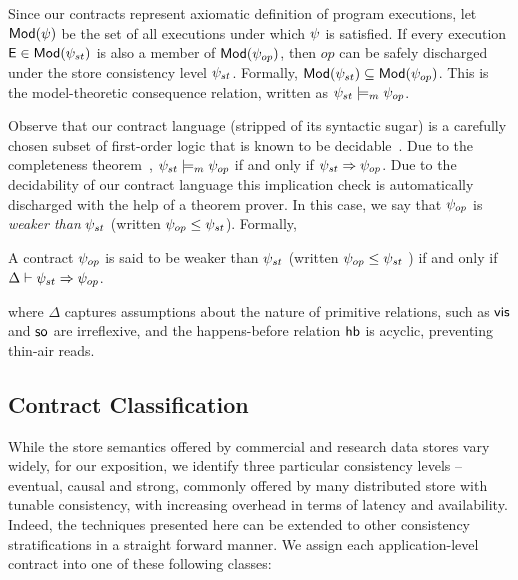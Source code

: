 Since our contracts represent axiomatic definition of program executions, let
${\normalfont \textsf{Mod}}(\psi)$ be the set of all executions under which $\psi$ is satisfied. If
every execution ${\normalfont \textsf{E}} \in {\normalfont \textsf{Mod}}(\psi_{st})$ is also a member of ${\normalfont \textsf{Mod}}(\psi_{op})$,
then $op$ can be safely discharged under the store consistency level
$\psi_{st}$. Formally, ${\normalfont \textsf{Mod}}(\psi_{st}) \subseteq {\normalfont \textsf{Mod}}(\psi_{op})$. This is the
model-theoretic consequence relation, written as $\psi_{st} \models_m \psi_{op}$.

Observe that our contract language (stripped of its syntactic sugar) is a
carefully chosen subset of first-order logic that is known to be
decidable~\cite{epr}. Due to the completeness theorem~\cite{completeness},
$\psi_{st} \models_m \psi_{op}$ if and only if $\psi_{st} \Rightarrow \psi_{op}$.
Due to the decidability of our contract language this implication check is
automatically discharged with the help of a theorem prover. In this case, we
say that $\psi_{op}$ is \emph{weaker than} $\psi_{st}$ (written $\psi_{op} \le
\psi_{st}$). Formally,

\begin{definition}
A contract $\psi_{op}$ is said to be weaker than $\psi_{st}$ (written $\psi_{op}
\le \psi_{st}$ ) if and only if $\Delta \vdash \psi_{st} \Rightarrow \psi_{op}$.
\begin{center}
\end{center}
\end{definition}
\vspace{-1em}

\noindent where $\Delta$ captures assumptions about the nature of primitive
relations, such as ${\normalfont \textsf{vis}}$ and ${\normalfont \textsf{so}}$ are irreflexive, and the happens-before
relation ${\normalfont \textsf{hb}}$ is acyclic, preventing thin-air reads. 

\subsection{Contract Classification}

While the store semantics offered by commercial and research data stores vary
widely, for our exposition, we identify three particular consistency levels --
eventual, causal and strong, commonly offered by many distributed store with
tunable consistency, with increasing overhead in terms of latency and
availability. Indeed, the techniques presented here can be extended to other
consistency stratifications in a straight forward manner. We assign each
application-level contract into one of these following classes:


